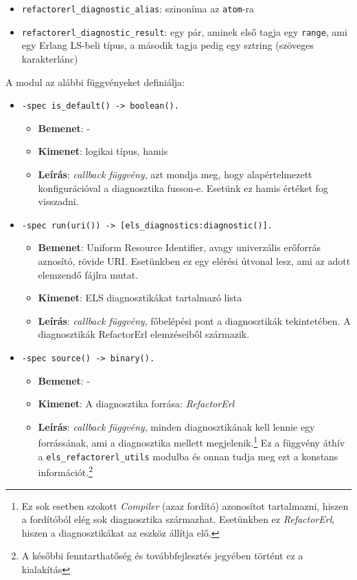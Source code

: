 \begin{itemize}
    \item \lstinline{refactorerl_diagnostic_alias}: szinoníma az \lstinline{atom}-ra
    \item \lstinline{refactorerl_diagnostic_result}: egy pár, aminek első tagja egy \lstinline{range}, ami egy Erlang LS-beli típus, a második tagja pedig egy sztring (szöveges karakterlánc)
\end{itemize}

A modul az alábbi függvényeket definiálja:

\begin{itemize}
    \item \lstinline{-spec is_default() -> boolean().}
        \begin{itemize}
            \item \textbf{Bemenet}: -
            \item \textbf{Kimenet}: logikai típus, hamis
            \item \textbf{Leírás}: \textit{callback függvény}, azt mondja meg, hogy alapértelmezett konfigurációval a diagnosztika fusson-e. Esetünk ez hamis értéket fog visszadni.
        \end{itemize}
     
    \item \lstinline{-spec run(uri()) -> [els_diagnostics:diagnostic()].}
        \begin{itemize}
            \item \textbf{Bemenet}: Uniform Resource Identifier, avagy univerzális erőforrás aznosító, rövide URI. Esetünkben ez egy elérési útvonal lesz, ami az adott elemzendő fájlra mutat.
            \item \textbf{Kimenet}: ELS diagnosztikákat tartalmazó lista
            \item \textbf{Leírás}: \textit{callback függvény}, főbelépési pont a diagnosztikák tekintetében. A diagnosztikák RefactorErl elemzéseiből származik.
        \end{itemize}
    
    \item \lstinline{-spec source() -> binary().}  
        \begin{itemize}
            \item \textbf{Bemenet}: -
            \item \textbf{Kimenet}: A diagnosztika forrása: \textit{RefactorErl}
            \item \textbf{Leírás}:  \textit{callback függvény}, minden diagnosztikának kell lennie egy forrássának, ami a diagnosztika mellett megjelenik.\footnote{Ez sok esetben szokott \textit{Compiler} (azaz fordító) azonosítot tartalmazni, hiszen a fordítóból elég sok diagnosztika származhat. Esetünkben ez \textit{RefactorErl}, hiszen a diagnosztikákat az eszköz állítja elő.} Ez a függvény áthív a \lstinline{els_refactorerl_utils} modulba és onnan tudja meg ezt a konstans információt.\footnote{A későbbi fenntarthatőség és továbbfejlesztés jegyében történt ez a kialakítás}
        \end{itemize}
    

\end{itemize}
